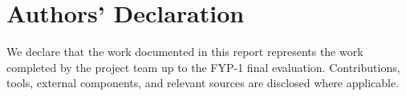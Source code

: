 \chapter*{Authors' Declaration}
We declare that the work documented in this report represents the work completed by the project team up to the FYP-1 final evaluation. Contributions, tools, external components, and relevant sources are disclosed where applicable.
